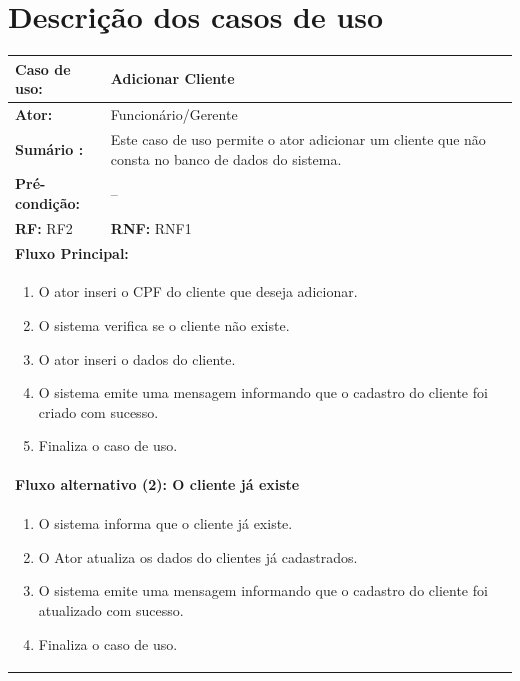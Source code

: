 \documentclass[
	12pt,				%
	openright,
	oneside,			%
	a4paper,			%
	chapter=TITLE,		%
	brazil				%
	]{abntex2}
\begin{document}
\section{Descrição dos casos de uso}



\begin{table}[h]
\centering
\begin{tabular}{|p{3cm}|p{3cm}|p{3cm}|p{3cm}|}
\hline
\textbf{Caso de uso:}             & \multicolumn{3}{p{9cm}|}{Adicionar Cliente}                    						 \\ \hline
\textbf{Ator:}                 & \multicolumn{3}{p{9cm}|}{Funcionário/Gerente}                   						 \\ \hline
\textbf{Sumário :}                & \multicolumn{3}{p{9cm}|}{Este caso de uso permite o ator adicionar um cliente %
													 que não consta no banco de dados do sistema.}         				\\ \hline
\textbf{Pré-condição:}            & \multicolumn{3}{p{9cm}|}{ -- }                                   				    \\ \hline
\multicolumn{2}{|p{6cm}|}{\textbf{RF:} RF2 }                  & \multicolumn{2}{p{6cm}|}{\textbf{RNF:} RNF1 }     	    \\ \hline
\multicolumn{4}{|p{12cm}|}{\textbf{Fluxo Principal:}}                                                					\\ \hline
\multicolumn{4}{|p{12cm}|}{%
\begin{enumerate}
  \item O ator inseri o CPF do cliente que deseja adicionar.
  \item O sistema verifica se o cliente não existe.
  \item O ator inseri o dados do cliente.
  \item O sistema emite uma mensagem informando que o cadastro do cliente foi criado com sucesso.
  \item Finaliza o caso de uso.
\end{enumerate}}                                                               				 							\\ \hline

\multicolumn{4}{|p{12cm}|}{\textbf{Fluxo alternativo (2): O cliente já existe}}            					\\ \hline
\multicolumn{4}{|p{12cm}|}{%
\begin{enumerate}
  \item O sistema informa que o cliente já existe.
  \item O Ator atualiza os dados do clientes já cadastrados.
  \item O sistema emite uma mensagem informando que o cadastro do cliente foi atualizado com sucesso.
  \item Finaliza o caso de uso.
\end{enumerate}}                                                               				 							\\ \hline


\end{tabular}
\end{table}
\end{document}
